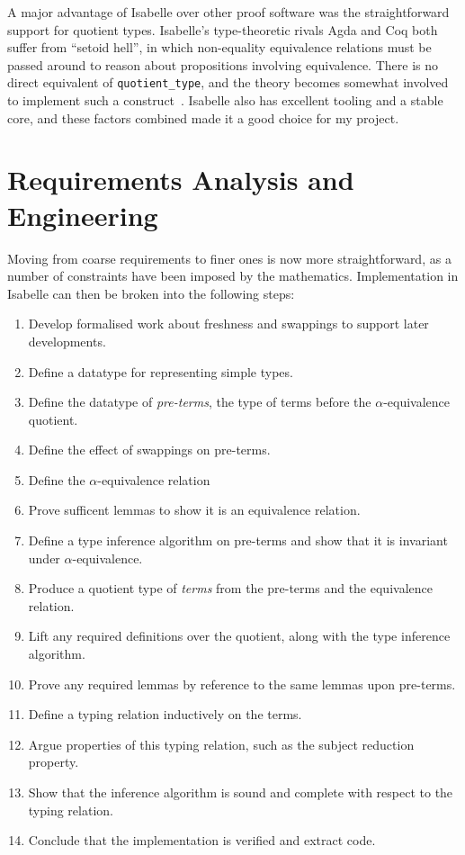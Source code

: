 A major advantage of Isabelle over other proof software was the straightforward support for quotient types.
Isabelle's type-theoretic rivals Agda and Coq both suffer from ``setoid hell'', in which non-equality equivalence relations must be passed around to reason about propositions involving equivalence.
There is no direct equivalent of \texttt{quotient\_type}, and the theory becomes somewhat involved to implement such a construct~\cite{quotients-hard}.
Isabelle also has excellent tooling and a stable core, and these factors combined made it a good choice for my project.

\section{Requirements Analysis and Engineering}
\label{sec:requirements}
Moving from coarse requirements to finer ones is now more straightforward, as a number of constraints have been imposed by the mathematics.
Implementation in Isabelle can then be broken into the following steps:
\begin{enumerate}
\item
Develop formalised work about freshness and swappings to support later developments.
\item
Define a datatype for representing simple types.
\item
Define the datatype of \emph{pre-terms}, the type of terms before the \(\alpha\)-equivalence quotient.
\item
Define the effect of swappings on pre-terms.
\item
Define the \(\alpha\)-equivalence relation
\item
Prove sufficent lemmas to show it is an equivalence relation.
\item
Define a type inference algorithm on pre-terms and show that it is invariant under \(\alpha\)-equivalence.
\item
Produce a quotient type of \emph{terms} from the pre-terms and the equivalence relation.
\item
Lift any required definitions over the quotient, along with the type inference algorithm.
\item
Prove any required lemmas by reference to the same lemmas upon pre-terms.
\item
Define a typing relation inductively on the terms.
\item
Argue properties of this typing relation, such as the subject reduction property.
\item
Show that the inference algorithm is sound and complete with respect to the typing relation.
\item
Conclude that the implementation is verified and extract code.
\end{enumerate}


